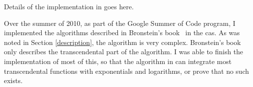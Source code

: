 Details of the implementation in \sympy goes here.

Over the summer of 2010, as part of the Google Summer of Code program, I
implemented the algorithms described in Bronstein's
book~\cite{bronstein2005symbolic} in the \sympy \gls{cas}.  As was noted
in Section \ref{description}, the algorithm is very complex. 
Bronstein's book only describes the
transcendental%
part of the algorithm. I was able to finish the implementation of most
of this, so that the algorithm in \sympy can integrate most
transcendental functions with exponentials and logarithms, %
or prove that no such \antiderivative exists.  

